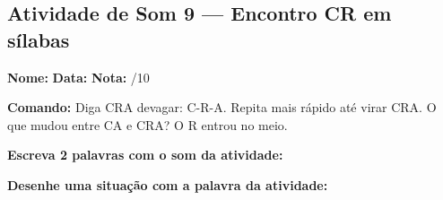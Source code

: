 \subsection{Atividade de Som 9 --- Encontro CR em sílabas}
\begin{exercicio}



\noindent\textbf{Nome:} \underline{\hspace{3.2cm}} \quad \textbf{Data:} \underline{\hspace{1.6cm}} \quad \textbf{Nota:} \underline{\hspace{0.9cm}}/10


\noindent\textbf{Comando:} Diga CRA devagar: C-R-A. Repita mais rápido até virar CRA. O que mudou entre CA e CRA? O R entrou no meio.


\begin{center}
\end{center}

\noindent\textbf{Escreva 2 palavras com o som da atividade:}

\begin{center}
  \underline{\hspace{3cm}} \quad \underline{\hspace{3cm}}
\end{center}

\noindent\textbf{Desenhe uma situação com a palavra da atividade:}

\begin{center}
\end{center}

\end{exercicio}



